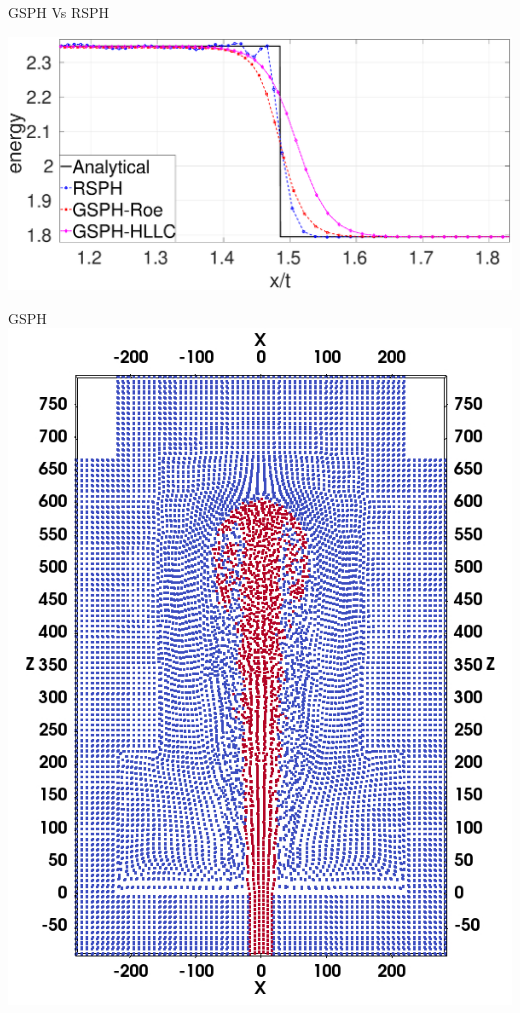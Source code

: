 \documentclass{beamer}
\begin{document}
\begin{frame}{GSPH Vs RSPH}
\begin{minipage}{0.35 \textwidth}
        \centering
        \includegraphics[width=0.99 \textwidth]{./Chapter-4/Figures/Sod/RCM-Sod-GSPH-compare-e-zoom}
\end{minipage}
%
\begin{minipage}{0.64 \textwidth}
	\begin{minipage}[b][][b]{.49 \textwidth}
       \centering \small{GSPH}
        \includegraphics[width=0.99 \textwidth]{./Chapter-4/Figures/GSPH-HLLC-t3-cutView}

\end{minipage}
\end{minipage}
\end{frame}
\end{document}
